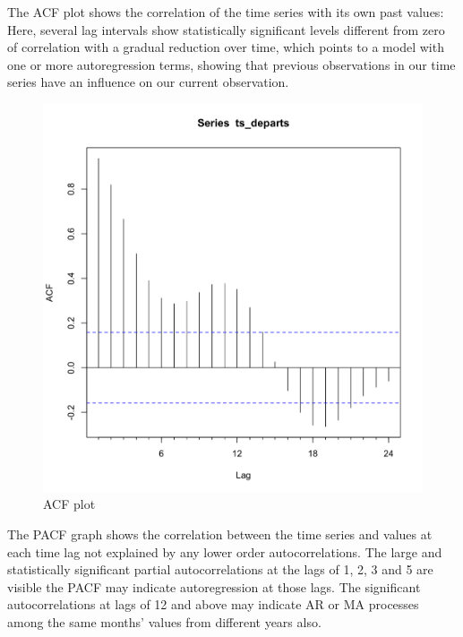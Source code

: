\documentclass[9pt,technote]{IEEEtran}
\begin{document}
The ACF plot shows the correlation of the time series with its own past values: Here, several lag intervals show statistically significant levels different from zero of correlation with a gradual reduction over time, which points to a model with one or more autoregression terms, showing that previous observations in our time series have an influence on our current observation.  

\begin{figure}[htbp]
\centerline{\includegraphics[scale=0.25]{Acf.png}}
\caption{ACF plot}
\label{fig:Acf}
\end{figure}

The PACF graph shows the correlation between the time series and values at each time lag not explained by any lower order autocorrelations.  The large and statistically significant partial autocorrelations at the lags of 1, 2, 3 and 5 are visible the PACF may indicate autoregression at those lags.  The significant autocorrelations at lags of 12 and above may indicate AR or MA processes among the same months' values from different years also.  
\end{document}
